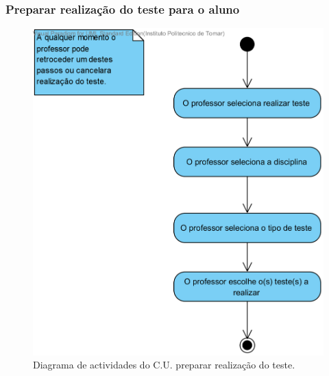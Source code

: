 \documentclass[a4paper]{article}
\begin{document}
				\subsubsection{Preparar realização do teste para o aluno}
					\begin{figure}[h]
						\centering
						\includegraphics[width=0.8\linewidth]{./diagramasAnaliseSistemas/PrepararRealizacaodoTeste}
						\caption{Diagrama de actividades do C.U. preparar realização do teste.}
						\label{fig:PrepararRealizacaodoTeste}
					\end{figure}
					
					\newpage
					
\end{document}
